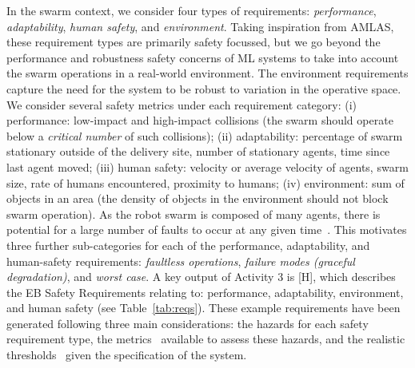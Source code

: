 \documentclass[runningheads]{llncs}
\begin{document}
In the swarm context, we consider four types of requirements: \emph{performance}, \emph{adaptability}, \emph{human safety}, and \emph{environment}. 
Taking inspiration from AMLAS, these requirement types are primarily safety focussed, but we go beyond the performance and robustness safety concerns of ML systems to take into account the swarm operations in a real-world environment. 
The environment requirements capture the need for the system to be robust to variation in the operative space. %
We consider several safety metrics under each requirement category: 
(i) performance: low-impact and high-impact collisions (the swarm should operate below a \emph{critical number} of such collisions); %
(ii) adaptability: percentage of swarm stationary outside of the delivery site, number of stationary agents, time since last agent moved; 
(iii) human safety: velocity or average velocity of agents, swarm size, rate of humans encountered, proximity to humans;
(iv) environment: sum of objects in an area (the density of objects in the environment should not block swarm operation).
As the robot swarm is composed of many agents, there is potential for a large number of faults to occur at any given time~\cite{Lee2022}. This motivates three further sub-categories for each of the performance, adaptability, and human-safety requirements: \emph{faultless operations}, \emph{failure modes (graceful degradation)}, and \emph{worst case}. 
A key output of Activity 3 is [H], which describes the EB Safety Requirements relating to: performance, adaptability, environment, and human safety (see Table~\ref{tab:reqs}).  
These example requirements have been generated following three main considerations: the hazards for each safety requirement type, the metrics~\cite{Lee2022} available to assess these hazards, and the realistic thresholds~\cite{Jones2022} given the specification of the system.
\end{document}
